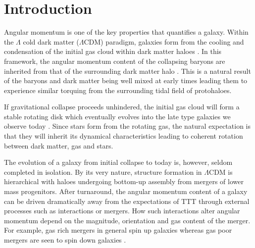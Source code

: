 \documentclass[fleqn,usenatbib]{mnras}
\begin{document}
\section{Introduction}
Angular momentum is one of the key properties that quantifies a galaxy. Within the $\Lambda$ cold dark matter ($\Lambda$CDM) paradigm, galaxies form from the cooling and condensation of the initial gas cloud within dark matter haloes \citep{fall1980, mo1998}. In this framework, the angular momentum content of the collapsing baryons are inherited from that of the surrounding dark matter halo \citep[tidal torque theory (TTT); e.g.][]{hoyle1951, peebles1969, Doroshkevich1970}. This is a natural result of the baryons and dark matter being well mixed at early times leading them to experience similar torquing from the surrounding tidal field of protohaloes. 

If gravitational collapse proceeds unhindered, the initial gas cloud will form a stable rotating disk which eventually evolves into the late type galaxies we observe today \citep{white1978}. Since stars form from the rotating gas, the natural expectation is that they will inherit its dynamical characteristics leading to coherent rotation between dark matter, gas and stars. 

The evolution of a galaxy from initial collapse to today is, however, seldom completed in isolation. By its very nature, structure formation in $\Lambda$CDM is hierarchical with haloes undergoing bottom-up assembly from mergers of lower mass progenitors. After turnaround, the angular momentum content of a galaxy can be driven dramatically away from the expectations of TTT through external processes such as interactions or mergers. How such interactions alter angular momentum depend on the magnitude, orientation and gas content of the merger. For example, gas rich mergers in general spin up galaxies whereas gas poor mergers are seen to spin down galaxies \citep[][]{lagos2017,lagos2018}.

\end{document}

